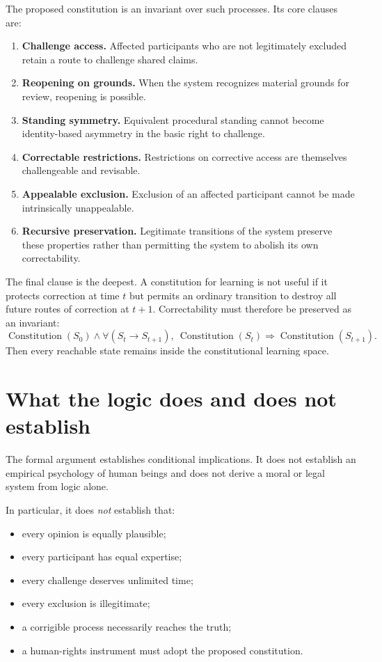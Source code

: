 \documentclass[11pt,a4paper]{article}
\begin{document}
The proposed constitution is an invariant over such processes. Its core clauses are:
\begin{enumerate}
  \item \textbf{Challenge access.} Affected participants who are not legitimately excluded retain a route to challenge shared claims.
  \item \textbf{Reopening on grounds.} When the system recognizes material grounds for review, reopening is possible.
  \item \textbf{Standing symmetry.} Equivalent procedural standing cannot become identity-based asymmetry in the basic right to challenge.
  \item \textbf{Correctable restrictions.} Restrictions on corrective access are themselves challengeable and revisable.
  \item \textbf{Appealable exclusion.} Exclusion of an affected participant cannot be made intrinsically unappealable.
  \item \textbf{Recursive preservation.} Legitimate transitions of the system preserve these properties rather than permitting the system to abolish its own correctability.
\end{enumerate}

The final clause is the deepest. A constitution for learning is not useful if it protects correction at time $t$ but permits an ordinary transition to destroy all future routes of correction at $t+1$. Correctability must therefore be preserved as an invariant:
\[
\operatorname{Constitution}(S_0)
\land
\forall(S_t\to S_{t+1}),\ 
\operatorname{Constitution}(S_t)\Rightarrow\operatorname{Constitution}(S_{t+1}).
\]
Then every reachable state remains inside the constitutional learning space.

\section{What the logic does and does not establish}

The formal argument establishes conditional implications. It does not establish an empirical psychology of human beings and does not derive a moral or legal system from logic alone.

In particular, it does \emph{not} establish that:
\begin{itemize}
  \item every opinion is equally plausible;
  \item every participant has equal expertise;
  \item every challenge deserves unlimited time;
  \item every exclusion is illegitimate;
  \item a corrigible process necessarily reaches the truth;
  \item a human-rights instrument must adopt the proposed constitution.
\end{itemize}
\end{document}

